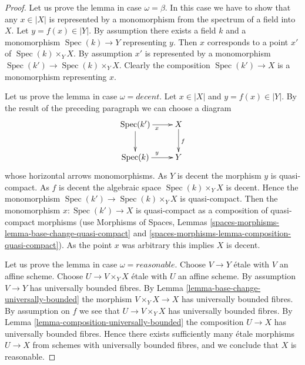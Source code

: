 \documentclass{stacks-project}
\theoremstyle{plain}
\theoremstyle{definition}
\theoremstyle{remark}
\numberwithin{equation}{subsection}
\def\Spec{\mathop{\mathrm{Spec}}}
\begin{document}
\begin{proof}
Let us prove the lemma in case $\omega = \beta$. In this case we have to show
that any $x \in |X|$ is represented by a monomorphism from the spectrum
of a field into $X$. Let $y = f(x) \in |Y|$. By assumption there exists
a field $k$ and a monomorphism $\Spec(k) \to Y$ representing $y$.
Then $x$ corresponds to a point $x'$ of $\Spec(k) \times_Y X$.
By assumption $x'$ is represented by a monomorphism
$\Spec(k') \to \Spec(k) \times_Y X$. Clearly the composition
$\Spec(k') \to X$ is a monomorphism representing $x$.

\medskip\noindent
Let us prove the lemma in case $\omega = decent$.
Let $x \in |X|$ and $y = f(x) \in |Y|$. By the result of the preceding
paragraph we can choose a diagram
$$
\xymatrix{
\Spec(k') \ar[r]_x \ar[d] & X \ar[d]^f \\
\Spec(k) \ar[r]^y & Y
}
$$
whose horizontal arrows monomorphisms. As $Y$ is decent the morphism
$y$ is quasi-compact. As $f$ is decent the algebraic space
$\Spec(k) \times_Y X$ is decent. Hence the monomorphism
$\Spec(k') \to \Spec(k) \times_Y X$ is quasi-compact.
Then the monomorphism $x : \Spec(k') \to X$ is quasi-compact
as a composition of quasi-compact morphisms (use
Morphisms of Spaces, Lemmas
\ref{spaces-morphisms-lemma-base-change-quasi-compact} and
\ref{spaces-morphisms-lemma-composition-quasi-compact}).
As the point $x$ was arbitrary this implies $X$ is decent.

\medskip\noindent
Let us prove the lemma in case $\omega = reasonable$.
Choose $V \to Y$ \'etale with $V$ an affine scheme.
Choose $U \to V \times_Y X$ \'etale with $U$ an affine scheme.
By assumption $V \to Y$ has universally bounded fibres. By
Lemma \ref{lemma-base-change-universally-bounded}
the morphism $V \times_Y X \to X$ has universally bounded fibres.
By assumption on $f$ we see that $U \to V \times_Y X$ has
universally bounded fibres. By
Lemma \ref{lemma-composition-universally-bounded}
the composition $U \to X$ has universally bounded fibres.
Hence there exists sufficiently many \'etale morphisms $U \to X$
from schemes with universally bounded fibres, and we conclude
that $X$ is reasonable.
\end{proof}
\end{document}
